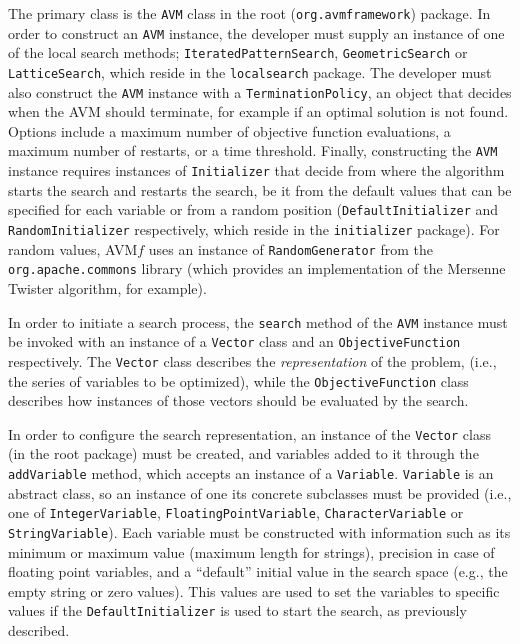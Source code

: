 \documentclass{llncs}
\newcommand{\name}{AVM\hspace{-1pt}$f$\xspace}
\newcommand{\inlineheading}[1]{\vspace{1mm} \noindent {\bf #1.}}
\begin{document}
\begin{sloppypar}
\inlineheading{Configuring an AVM search} The primary class is the {\tt AVM} class in the root ({\tt org.avmframework}) package. In order to construct an {\tt AVM} instance, the developer must supply an instance of one of the local search methods; {\tt IteratedPatternSearch}, {\tt GeometricSearch} or {\tt LatticeSearch}, which reside in the {\tt localsearch} package. The developer must also construct the {\tt AVM} instance with a {\tt TerminationPolicy}, an object that decides when the AVM should terminate, for example if an optimal solution is not found. Options include a maximum number of objective function evaluations, a maximum number of restarts, or a time threshold. Finally, constructing the {\tt AVM} instance requires instances of {\tt Initializer} that decide from where the algorithm starts the search and restarts the search, be it from the default values that can be specified for each variable or from a random position ({\tt DefaultInitializer} and {\tt RandomInitializer} respectively, which reside in the {\tt initializer} package). For random values, \name uses an instance of {\tt RandomGenerator} from the {\tt org.apache.commons} library (which provides an implementation of the Mersenne Twister algorithm, for example).
\end{sloppypar}

\begin{sloppypar}
In order to initiate a search process, the {\tt search} method of the {\tt AVM} instance must be invoked with an instance of a {\tt Vector} class and an {\tt ObjectiveFunction} respectively. The {\tt Vector} class describes the {\it representation} of the problem,
(i.e., the series of variables to be optimized), while the {\tt ObjectiveFunction} class describes how instances of those vectors should be evaluated by the search.
\end{sloppypar}

\begin{sloppypar}
\inlineheading{Representation} In order to configure the search representation, an instance of the {\tt Vector} class (in the root package) must be created, and variables added to it through the {\tt addVariable} method, which accepts an instance of a {\tt Variable}. {\tt Variable} is an abstract class, so an instance of one its concrete subclasses must be provided (i.e., one of {\tt IntegerVariable}, {\tt FloatingPointVariable}, {\tt CharacterVariable} or {\tt StringVariable}). Each variable must be constructed with information such as its minimum or maximum value (maximum length for strings), precision in case of floating point variables, and a ``default'' initial value in the search space (e.g., the empty string or zero values). This values are used to set the variables to specific values if the {\tt DefaultInitializer} is used to start the search, as previously described.
\end{sloppypar}
\end{document}
